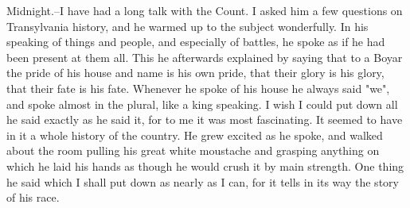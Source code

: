 Midnight.--I have had a long talk with the Count. I asked him a few questions on Transylvania history, and he warmed up to the subject wonderfully. In his speaking of things and people, and especially of battles, he spoke as if he had been present at them all. This he afterwards explained by saying that to a Boyar the pride of his house and name is his own pride, that their glory is his glory, that their fate is his fate. Whenever he spoke of his house he always said "we", and spoke almost in the plural, like a king speaking. I wish I could put down all he said exactly as he said it, for to me it was most fascinating. It seemed to have in it a whole history of the country. He grew excited as he spoke, and walked about the room pulling his great white moustache and grasping anything on which he laid his hands as though he would crush it by main strength. One thing he said which I shall put down as nearly as I can, for it tells in its way the story of his race. 

